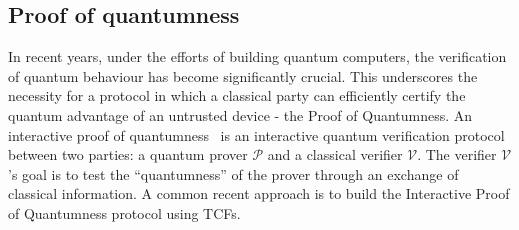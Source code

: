 \subsection{Proof of quantumness}
In recent years, under the efforts of building quantum computers, the verification of quantum behaviour has become significantly crucial. This underscores the necessity for a protocol in which a classical party can efficiently certify the quantum advantage of an untrusted device - the Proof of Quantumness. An interactive proof of quantumness~\cite{Brakerski18_Interactiveproofofquantumness,experiment_interactive_PoQ} is an interactive quantum verification protocol between two parties: a quantum prover $\mathcal{P}$ and a classical verifier $\mathcal{V}$. The verifier $\mathcal{V}$'s goal is to test the ``quantumness'' of the prover through an exchange of classical information. A common recent approach is to build the Interactive Proof of Quantumness protocol using TCFs.


